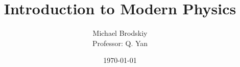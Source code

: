 


\title{Introduction to Modern Physics}
\date{\today}
\author{Michael Brodskiy\\ \small Professor: Q. Yan}



\maketitle

\newpage

\tableofcontents

\newpage

